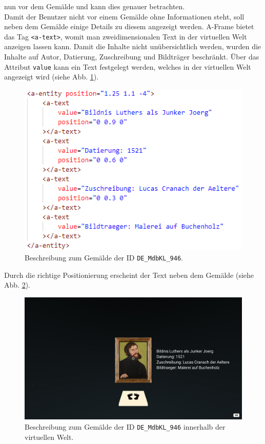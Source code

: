 \documentclass[a4paper,12pt,oneside]{article}
\begin{document}
        nun vor dem Gemälde und kann dies genauer betrachten. \\
        Damit der Benutzer nicht vor einem Gemälde ohne Informationen
        steht, soll neben dem Gemälde einige Details zu diesem angezeigt
        werden. A-Frame bietet das Tag \texttt{<a-text>}, womit man 
        zweidimensionalen Text in der virtuellen Welt anzeigen lassen kann.
        Damit die Inhalte nicht unübersichtlich werden, wurden die Inhalte
        auf Autor, Datierung, Zuschreibung und Bildträger beschränkt. 
        Über das Attribut \texttt{value} kann ein Text festgelegt werden,
        welches in der virtuellen Welt angezeigt wird
        (siehe Abb. \ref{fig:description2}). \\
        \begin{figure}
          \centering
          \includegraphics{img/coding/description2.png}
          \caption{Beschreibung zum Gemälde der ID \texttt{DE\_MdbKL\_946}.}
          \label{fig:description2}
        \end{figure}
        Durch die richtige Positionierung erscheint der Text neben
        dem Gemälde (siehe Abb. \ref{fig:description1}).
        \begin{figure}
          \centering
          \includegraphics[scale=0.3]{img/coding/description1.png}
          \caption{Beschreibung zum Gemälde der ID \texttt{DE\_MdbKL\_946} innerhalb der virtuellen Welt.}
          \label{fig:description1}
        \end{figure}
\end{document}
